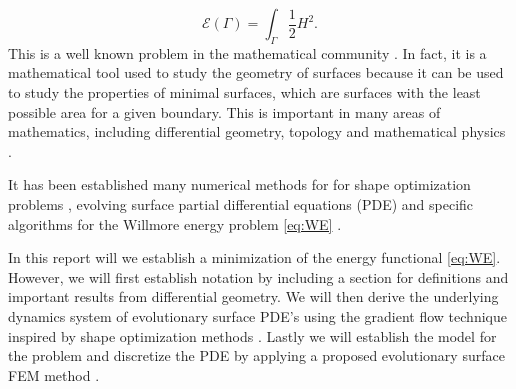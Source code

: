 \begin{equation}
\label{eq:WE}
\mathcal{E} \left( \Gamma  \right) = \int_{\Gamma }^{} \frac{1}{2} H ^2
.\end{equation}
This is a well known problem in the mathematical community \cite{ topping2000towards, marques2014willmore,link2013gradient}. In fact, it is a mathematical tool used to study the geometry of surfaces because it can be used to study the properties of minimal surfaces, which are surfaces with the least possible area for a given boundary. This is important in many areas of mathematics, including differential geometry, topology and mathematical physics \cite{koerber2021area,jakob2022singularities, rupp21}.



It has been established many numerical methods for for shape optimization problems \cite{sokolowski1992introduction,ito2008variational}, evolving surface partial differential equations (PDE) \cite{dziuk2013finite, dziuk2007finite,
binz2022convergent, barrett2007parametric, barrett2007variational, kovacs2019convergent} and specific
algorithms for the Willmore energy problem \eqref{eq:WE} \cite{palmurella2022parametric, dziuk2008computational, bonito2010parametric,  kovacs2021convergent, hu2022evolving}.

In this report will we establish a minimization of the energy functional \eqref{eq:WE}. However, we will first establish notation by including a section for definitions and important results from differential geometry. We will then derive the
underlying dynamics system of evolutionary surface PDE's \cite{dougan2012first} using the gradient flow technique inspired by shape optimization methods \cite{ito2008variational}. Lastly we will establish the model for the problem and discretize the
PDE by applying a proposed evolutionary surface FEM method \cite{kovacs2021convergent}.



